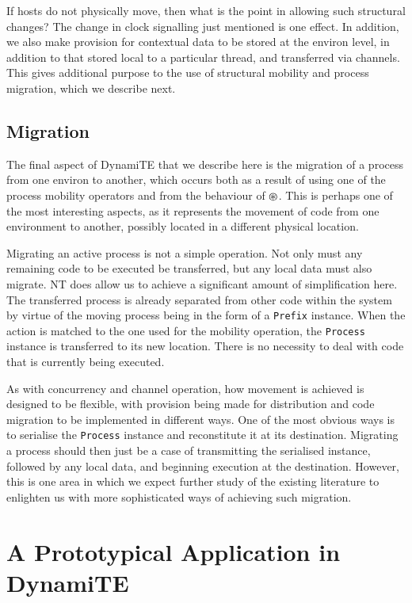 If hosts do not physically move, then what is the point in allowing such
structural changes?  The change in clock signalling just mentioned is
one effect.  In addition, we also make provision for contextual data to
be stored at the environ level, in addition to that stored local to a
particular thread, and transferred via channels.  This gives additional
purpose to the use of structural mobility and process migration, which
we describe next.

\subsection{Migration}
\label{dyn:migration}

The final aspect of DynamiTE that we describe here is the migration of a
process from one environ to another, which occurs both as a result of
using one of the process mobility operators and from the behaviour of
$\tntopen$.  This is perhaps one of the most interesting aspects, as it
represents the movement of code from one environment to another,
possibly located in a different physical location.

Migrating an active process is not a simple operation.  Not only must
any remaining code to be executed be transferred, but any local data
must also migrate.  NT does allow us to achieve a significant amount of
simplification here.  The transferred process is already separated from
other code within the system by virtue of the moving process being in
the form of a \texttt{Prefix} instance.  When the action is matched to
the one used for the mobility operation, the \texttt{Process} instance
is transferred to its new location.  There is no necessity to deal with
code that is currently being executed.

As with concurrency and channel operation, how movement is achieved is
designed to be flexible, with provision being made for distribution and
code migration to be implemented in different ways.  One of the most
obvious ways is to serialise the \texttt{Process} instance and
reconstitute it at its destination.  Migrating a process should then
just be a case of transmitting the serialised instance, followed by any
local data, and beginning execution at the destination.  However, this
is one area in which we expect further study of the existing literature
to enlighten us with more sophisticated ways of achieving such
migration.

\section{A Prototypical Application in DynamiTE}
\label{app:dynamite}
                                   
